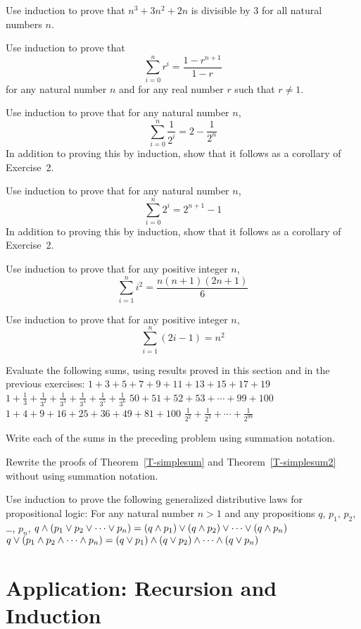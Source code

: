 \begin{exercises}

\problem Use induction to prove that $n^3 + 3n^2 + 2n$ is divisible by 3
for all natural numbers $n$.

\problem Use induction to prove that
\[\sum_{i=0}^{n}r^i=\frac{1-r^{n+1}}{1-r}\]
for any natural number $n$ and for any real number $r$ such that $r\not=1$.

\problem Use induction to prove that for any natural number $n$,
\[\sum_{i=0}^{n}\frac{1}{2^i}=2-\frac{1}{2^{n}}\]
In addition to proving this by induction, show that it follows
as a corollary of Exercise~2.

\problem Use induction to prove that for any natural number $n$,
\[\sum_{i=0}^{n}2^i=2^{n+1}-1\]
In addition to proving this by induction, show that it follows
as a corollary of Exercise~2.

\problem Use induction to prove that for any positive integer $n$,
\[\sum_{i=1}^ni^2=\frac{n(n+1)(2n+1)}{6}\]

\problem Use induction to prove that for any positive integer $n$,
\[\sum_{i=1}^n(2i-1)=n^2\]

\problem Evaluate the following sums, using results proved in this
section and in the previous exercises:
\ppart $1+3+5+7+9+11+13+15+17+19$
\ppart $\displaystyle 1+\frac{1}{3}+\frac{1}{3^2}+\frac{1}{3^3}+\frac{1}{3^4}+\frac{1}{3^5}+\frac{1}{3^6}$
\ppart $50+51+52+53+\cdots+99+100$
\ppart $1+4+9+16+25+36+49+81+100$
\ppart $\displaystyle \frac{1}{2^2}+\frac{1}{2^3}+\cdots+\frac{1}{2^{99}}$

\problem Write each of the sums in the preceding problem using
summation notation.

\problem Rewrite the proofs of Theorem~\ref{T-simplesum} and
Theorem~\ref{T-simplesum2} without using summation notation.

\problem Use induction to prove the following generalized distributive
laws for propositional logic:  For any natural number $n>1$ and any
propositions $q$, $p_1$, $p_2$, \dots, $p_n$,
\ppart $q\wedge(p_1\vee p_2\vee\cdots\vee p_n)=(q\wedge p_1)\vee(q\wedge p_2)\vee\cdots\vee(q\wedge p_n)$
\ppart $q\vee(p_1\wedge p_2\wedge\cdots\wedge p_n)=(q\vee p_1)\wedge(q\vee p_2)\wedge\cdots\wedge(q\vee p_n)$


\end{exercises}


\section{Application: Recursion and Induction}

